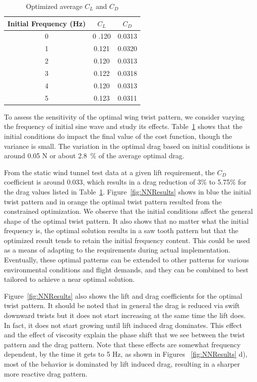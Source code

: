 \documentclass[11pt]{ucthesis}
\begin{document}
\begin{table}[h]
\caption{Optimized average $C_L$ and $C_D$}
\label{tab:drag}
\begin{center}
\begin{tabular}{|c||c||c|}
\hline
Initial Frequency (Hz)&$C_L$&$C_D$\\
\hline
0 &0 .120&0.0313\\
\hline
1 &0.121&0.0320 \\
\hline
2&0.120&0.0313\\
\hline
3&0.122&0.0318\\
\hline
4&0.120&0.0313\\
\hline
5&0.123&0.0311\\
\hline
\end{tabular}
\end{center}
\end{table}
To assess the sensitivity of the optimal wing twist pattern, we consider varying the frequency of initial sine wave and study its effects. Table~\ref{tab:drag} shows that the initial conditions do impact the final value of the cost function, though the variance is small. The variation in the optimal drag based on initial conditions is around 0.05 N or about 2.8~\% of the average optimal drag. 

From the static wind tunnel test data at a given lift requirement, the $C_D$ coefficient is around 0.033, which results in a drag reduction of 3\% to 5.75\% for the drag values listed in Table~\ref{tab:drag}. Figure~\ref{fig:NNResults} shows in blue the initial twist pattern and in orange the optimal twist pattern resulted from the constrained optimization. We observe that the initial conditions affect the general shape of the optimal twist pattern. It also shows that no matter what the initial frequency is, the optimal solution results in a saw tooth pattern but that the optimized result tends to retain the initial frequency content. This could be used as a means of adapting to the requirements during actual implementation. Eventually, these optimal patterns can be extended to other patterns for various environmental conditions and flight demands, and they can be combined to best tailored to achieve a near optimal solution.

Figure~\ref{fig:NNResults} also shows the lift and drag coefficients for the optimal twist pattern. It should be noted that in general the drag is reduced via swift downward twists but it does not start increasing at the same time the lift does. In fact, it does not start growing until lift induced drag dominates. This effect and the effect of viscosity explain the phase shift that we see between the twist pattern and the drag pattern. Note that these effects are somewhat frequency dependent, by the time it gets to 5 Hz, as shown in Figures ~\ref{fig:NNResults} d), most of the behavior is dominated by lift induced drag, resulting in a sharper more reactive drag pattern.
\end{document}
